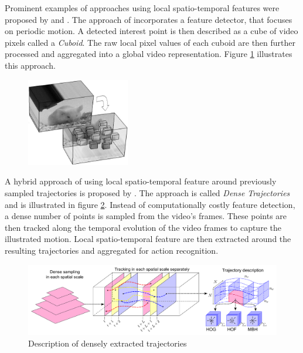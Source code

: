 Prominent examples of approaches using local spatio-temporal features were proposed by \textcite{laptev_space-time_2005} and \textcite{dollar_behavior_2005}.
The approach of \cite{dollar_behavior_2005} incorporates a feature detector, that focuses on periodic motion.
A detected interest point is then described as a cube of video pixels called a \textit{Cuboid}.
The raw local pixel values of each cuboid are then further processed and aggregated into a global video representation.
Figure \ref{fig:dollar_cuboids} illustrates this approach.

\begin{figure}[H]
    \centering
    \includegraphics[width=0.4\textwidth]{img_related/dollar_cuboids}
    \caption{\cite{dollar_behavior_2005}}
    \label{fig:dollar_cuboids}
\end{figure}

A hybrid approach of using local spatio-temporal feature around previously sampled trajectories is proposed by \textcite{wang_action_2011}.
The approach is called \textit{Dense Trajectories} and is illustrated in figure \ref{fig:densetrajectories_approach}.
Instead of computationally costly feature detection, a dense number of points is sampled from the video's frames.
These points are then tracked along the temporal evolution of the video frames to capture the illustrated motion.
Local spatio-temporal feature are then extracted around the resulting trajectories and aggregated for action recognition.

\begin{figure}[H]
    \centering
    \includegraphics[width=\textwidth]{img_related/densetrajectories_approach}
    \caption{Description of densely extracted trajectories \cite{wang_action_2011}}
    \label{fig:densetrajectories_approach}
\end{figure}

